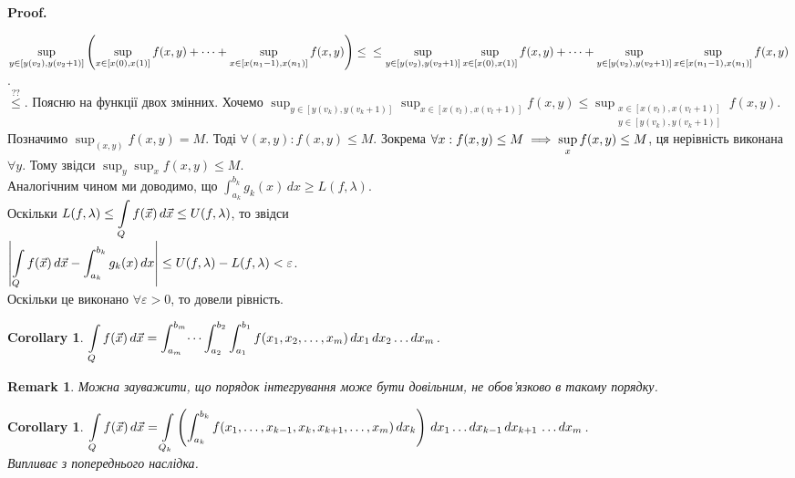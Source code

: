 \documentclass[a4paper, 10pt]{article}
\makeatletter
\def\qed{$\blacksquare$}
\theoremstyle{theoremdd}
\theoremstyle{theoremdd}
\theoremstyle{theoremdd}
\theoremstyle{theoremdd}
\theoremstyle{theoremdd}
\theoremstyle{theoremdd}
\newtheorem{remark}[theorem]{Remark}
\theoremstyle{theoremdd}
\theoremstyle{theoremdd}
\newtheorem{corollary}[theorem]{Corollary}
\renewenvironment{proof}[1][Proof.\\]{\par
\pushQED{\hfill \qed}%
\normalfont \topsep6\p@\@plus6\p@\relax
\trivlist
\item\relax
{\bfseries
#1\@addpunct{.}}\hspace\labelsep\ignorespaces
}{%
\popQED\endtrivlist\@endpefalse
}
\makeatother
\begin{document}
\begin{proof}
$\displaystyle\sup_{y \in [y(v_2),y(v_2+1)]} \left( \sup_{x \in [x(0),x(1)]} f(x,y) + \dots + \sup_{x \in [x(n_1-1), x(n_1)] }f(x,y)\right) \leq \\ \leq \sup_{y \in [y(v_2),y(v_2+1)]} \sup_{x \in [x(0),x(1)]} f(x,y) + \dots + \sup_{y \in [y(v_2),y(v_2+1)]} \sup_{x \in [x(n_1-1), x(n_1)]} f(x,y)$.\\
$\overset{??}{\leq}$. Поясню на функції двох змінних. Хочемо $\displaystyle\sup_{y \in [y(v_k),y(v_k+1)]} \sup_{x \in [x(v_l),x(v_l+1)]} f(x,y) \leq \sup_{\substack{x \in [x(v_l),x(v_l+1)] \\ y \in [y(v_k),y(v_k+1)]}} f(x,y)$.\\
Позначимо $\displaystyle\sup_{(x,y)} f(x,y) = M$. Тоді $\forall (x,y): f(x,y) \leq M$. Зокрема $\forall x: f(x,y) \leq M \\ \implies \displaystyle\sup_x f(x,y) \leq M$, ця нерівність виконана $\forall y$. Тому звідси $\displaystyle\sup_y \sup_x f(x,y) \leq M$.\\
Аналогічним чином ми доводимо, що $\displaystyle\int_{a_k}^{b_k} g_k(x)\,dx \geq L(f,\lambda)$.\\
Оскільки $L(f,\lambda) \leq \displaystyle\int\displaylimits_Q f(\vec{x})\,d \vec{x} \leq U(f,\lambda)$, то звідси\\
$\displaystyle\abs{\int\displaylimits_Q f(\vec{x})\,d \vec{x} - \int_{a_k}^{b_k} g_k(x)\,dx} \leq U(f,\lambda) - L(f,\lambda) < \varepsilon$.\\
Оскільки це виконано $\forall \varepsilon >0$, то довели рівність.
\end{proof}

\begin{corollary}
$\displaystyle\int\displaylimits_Q f(\vec{x})\,d\vec{x} = \int_{a_m}^{b_m} \dots \int_{a_2}^{b_2} \int_{a_1}^{b_1} f(x_1,x_2,\dots,x_m)\,dx_1\,dx_2 \dots dx_m$.
\end{corollary}

\begin{remark}
Можна зауважити, що порядок інтегрування може бути довільним, не обов'язково в такому порядку.
\end{remark}

\begin{corollary}
$\displaystyle\int\displaylimits_Q f(\vec{x})\,d\vec{x} = \int\displaylimits_{Q_k} \left( \int_{a_k}^{b_k} f(x_1,\dots,x_{k-1},x_k,x_{k+1},\dots,x_m)\,dx_k \right)\,dx_1 \dots dx_{k-1}\,dx_{k+1}\,\dots dx_m$.\\
\textit{Випливає з попереднього наслідка.}
\end{corollary}
\end{document}
